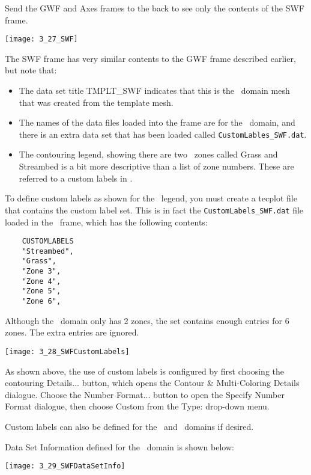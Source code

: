 Send the {\sf GWF} and {\sf Axes} frames to the back to see only the contents of the {\sf SWF} frame.

        \texttt{[image: 3\_27\_SWF]}



The {\sf SWF} frame has very similar contents to the {\sf GWF} frame described earlier, but note that:
\begin{itemize}
  \item   The data set title {\sf TMPLT\_SWF} indicates that this is the \swf\ domain mesh that was created from the template mesh.
  \item The names of the data files loaded into the frame are for the \swf\ domain, and there is an extra data set that has been loaded called {\tt CustomLables\_SWF.dat}.
  \item The contouring legend, showing there are two \swf\ zones called {\sf Grass} and {\sf Streambed} is a bit more descriptive than a list of zone numbers.   These are referred to a custom labels in \tecplot.
\end{itemize}

 To define custom labels as shown for the \swf\ legend, you must create a tecplot file that contains the custom label set.  This is in fact the {\tt CustomLabels\_SWF.dat} file loaded in the \swf\ frame, which has the following contents:
\begin{verbatim}
    CUSTOMLABELS
    "Streambed",
    "Grass",
    "Zone 3",
    "Zone 4",
    "Zone 5",
    "Zone 6",
\end{verbatim}
Although the \swf\ domain only has 2 zones, the set contains enough entries for 6 zones.  The extra entries are ignored.

        \texttt{[image: 3\_28\_SWFCustomLabels]}

As shown above, the use of custom labels is configured by first choosing the contouring {\sf Details...} button, which opens the {\sf Contour \& Multi-Coloring Details} dialogue.  Choose the {\sf Number Format...} button to open the {\sf Specify Number Format} dialogue, then choose {\sf Custom} from the {\sf Type:} drop-down menu.

Custom labels can also be defined for the \gwf\ and \cln\ domains if desired.

\pagebreak
{\sf Data Set Information} defined for the \swf\ domain is shown below:

        \texttt{[image: 3\_29\_SWFDataSetInfo]}

